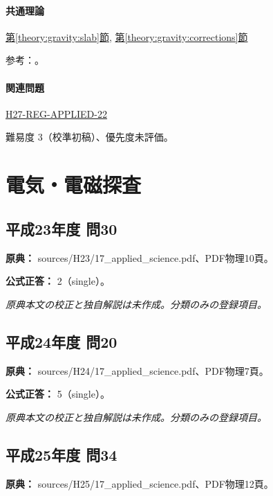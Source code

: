 \paragraph{共通理論} \hyperref[theory:gravity:slab]{第\ref*{theory:gravity:slab}節}, \hyperref[theory:gravity:corrections]{第\ref*{theory:gravity:corrections}節}

\par 参考：\cite{gsi_gravity_definitions}。

\paragraph{関連問題} \hyperref[q:h27-reg-applied-22]{H27-REG-APPLIED-22}

\par 難易度 3（校準初稿）、優先度未評価。

\section{電気・電磁探査}

\subsection{平成23年度 問30}
\label{q:h23-reg-applied-30}

\noindent\textbf{原典：} sources/H23/17\_applied\_science.pdf、PDF物理10頁。

\textbf{公式正答：} 2（single）。

\par\textit{原典本文の校正と独自解説は未作成。分類のみの登録項目。}

\subsection{平成24年度 問20}
\label{q:h24-reg-applied-20}

\noindent\textbf{原典：} sources/H24/17\_applied\_science.pdf、PDF物理7頁。

\textbf{公式正答：} 5（single）。

\par\textit{原典本文の校正と独自解説は未作成。分類のみの登録項目。}

\subsection{平成25年度 問34}
\label{q:h25-reg-applied-34}

\noindent\textbf{原典：} sources/H25/17\_applied\_science.pdf、PDF物理12頁。

